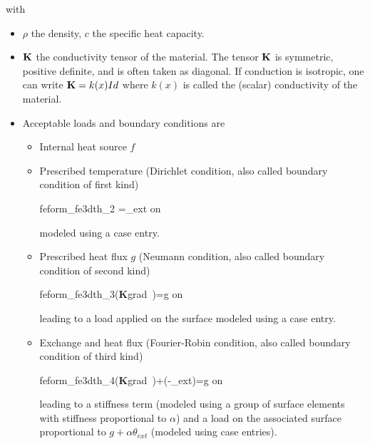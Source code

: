 with
\begin{itemize}
\item $\rho$ the density,  $c$ the specific heat capacity.
\item ${\bf K}$ the conductivity tensor of the material. The tensor ${\bf K}$ is symmetric, positive definite, and is often taken as diagonal. If conduction is isotropic, one can write ${\bf K}=k(x)Id$ where $k(x)$ is called the (scalar) conductivity of the material.

\item Acceptable loads and boundary conditions are 

\begin{itemize} 
\item{Internal heat source $f$}\\
\item{Prescribed temperature (Dirichlet condition, also called boundary condition of first kind)}\\
\begin{eqsvg}{feform_fe3dth_2} \theta=\theta_{ext} \quad on \quad \partial\Omega \end{eqsvg}
modeled using a  case entry.

\item{Prescribed heat flux $g$ (Neumann condition, also called boundary condition of second kind)}\\

\begin{eqsvg}{feform_fe3dth_3}({\bf K}grad \,\theta)\cdot{}=g \quad on \quad \partial\Omega \end{eqsvg}
leading to a load applied on the surface modeled using a  case entry.

\item{Exchange and heat flux (Fourier-Robin condition, also called boundary condition of third kind)}\\
\begin{eqsvg}{feform_fe3dth_4}({\bf K}grad \,\theta)\cdot{}+\alpha(\theta-\theta_{ext})=g \quad on \quad \partial\Omega \end{eqsvg}

leading to a stiffness term (modeled using a group of surface elements with stiffness proportional to $\alpha$) and a load on the associated surface proportional to $g+\alpha\theta_{ext}$ (modeled using  case entries).

\end{itemize}
\end{itemize}


